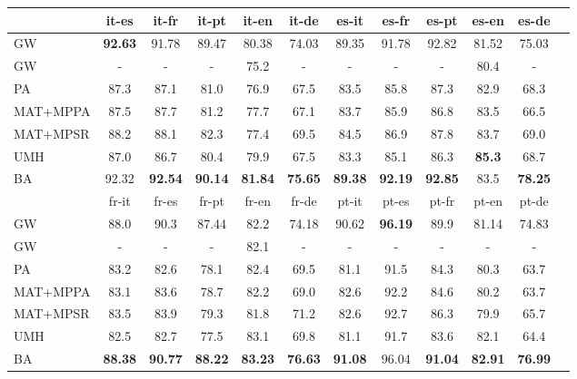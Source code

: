 \documentclass{article}
\begin{document}
\begin{table*}[ht]
\centering

\begin{tabular}{@{}l@{}*{11}{c}@{}}
    \hline
      & it-es & it-fr & it-pt & it-en & it-de & es-it & es-fr & es-pt & es-en & es-de \\
      \hline
GW & \textbf{92.63} & {91.78} & {89.47} & {80.38} & {74.03} & {89.35} & {91.78} & {92.82} & {81.52} & {75.03} \\
{GW} & - & - & - & {75.2} & {-} & - & - & - & {80.4} & - \\
PA & {87.3} & {87.1} & {81.0} & {76.9} & {67.5} & {83.5} & {85.8} & {87.3} & {82.9} & {68.3} \\
MAT+MPPA & {87.5} & {87.7} & {81.2} & {77.7} & {67.1} & {83.7} & {85.9} & {86.8} & {83.5} & {66.5} \\
MAT+MPSR & {88.2} & {88.1} & {82.3} & {77.4} & {69.5} & {84.5} & {86.9} & {87.8} & {83.7} & {69.0} \\
UMH & {87.0} & {86.7} & {80.4} & {79.9} & {67.5} & {83.3} & {85.1} & {86.3} & \textbf{85.3} & {68.7} \\
BA & 92.32 & \textbf{92.54} & \textbf{90.14} & \textbf{81.84} & \textbf{75.65} & \textbf{89.38} & \textbf{92.19} & \textbf{92.85} & {83.5} & \textbf{78.25} \\
    \hline
 & fr-it & fr-es & fr-pt & fr-en & fr-de & pt-it & pt-es & pt-fr & pt-en & pt-de \\
 \hline
GW & {88.0} & {90.3} & {87.44} & {82.2} & {74.18} & {90.62} & \textbf{96.19} & {89.9} & {81.14} & {74.83} \\
{GW} & - & - & - & {82.1} & {-} & - & - & - & {-} & - \\
PA & {83.2} & {82.6} & {78.1} & {82.4} & {69.5} & {81.1} & {91.5} & {84.3} & {80.3} & {63.7} \\
MAT+MPPA & {83.1} & {83.6} & {78.7} & {82.2} & {69.0} & {82.6} & {92.2} & {84.6} & {80.2} & {63.7} \\
MAT+MPSR & {83.5} & {83.9} & {79.3} & {81.8} & {71.2} & {82.6} & {92.7} & {86.3} & {79.9} & {65.7} \\
UMH & {82.5} & {82.7} & {77.5} & {83.1} & {69.8} & {81.1} & {91.7} & {83.6} & {82.1} & {64.4} \\
BA  & \textbf{88.38} & \textbf{90.77} & \textbf{88.22} & \textbf{83.23} & \textbf{76.63} & \textbf{91.08} & {96.04} & \textbf{91.04} & \textbf{82.91} & \textbf{76.99} \\


\end{tabular}
\end{table*}
\end{document}

